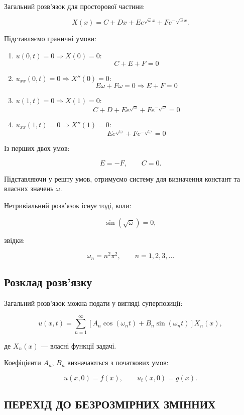 \documentclass[
  ukrainian,
]{article}
\begin{document}
Загальний розв'язок для просторової частини:

\[
X(x) = C + Dx + E e^{\sqrt{\omega}x} + F e^{-\sqrt{\omega}x}.
\]

Підставляємо граничні умови:

\begin{enumerate}
\def\labelenumi{\arabic{enumi}.}
\item
  \(u(0,t)=0 \Rightarrow X(0)=0\): \[
  C + E + F = 0
  \]
\item
  \(u_{xx}(0,t)=0 \Rightarrow X''(0)=0\): \[
  E\omega + F\omega = 0 \Rightarrow E + F = 0
  \]
\item
  \(u(1,t)=0 \Rightarrow X(1)=0\): \[
  C + D + E e^{\sqrt{\omega}} + F e^{-\sqrt{\omega}} = 0
  \]
\item
  \(u_{xx}(1,t)=0 \Rightarrow X''(1)=0\): \[
  E e^{\sqrt{\omega}} + F e^{-\sqrt{\omega}} = 0
  \]
\end{enumerate}

Із перших двох умов:

\[
E = -F, \qquad C = 0.
\]

Підставляючи у решту умов, отримуємо систему для визначення констант та
власних значень \(\omega\).

Нетривіальний розв'язок існує тоді, коли:

\[
\sin(\sqrt{\omega}) = 0,
\]

звідки:

\[
\omega_n = n^2 \pi^2, \qquad n = 1,2,3,\dots
\]

\subsection{Розклад
розв'язку}\label{ux440ux43eux437ux43aux43bux430ux434-ux440ux43eux437ux432ux44fux437ux43aux443}

Загальний розв'язок можна подати у вигляді суперпозиції:

\[
u(x,t) = \sum_{n=1}^{\infty} \left[
A_n \cos(\omega_n t) + B_n \sin(\omega_n t)
\right] X_n(x),
\]

де \(X_n(x)\) --- власні функції задачі.

Коефіцієнти \(A_n\), \(B_n\) визначаються з початкових умов:

\[
u(x,0) = f(x), \qquad u_t(x,0) = g(x).
\]

\subsection{ПЕРЕХІД ДО БЕЗРОЗМІРНИХ
ЗМІННИХ}\label{ux43fux435ux440ux435ux445ux456ux434-ux434ux43e-ux431ux435ux437ux440ux43eux437ux43cux456ux440ux43dux438ux445-ux437ux43cux456ux43dux43dux438ux445}
\end{document}
